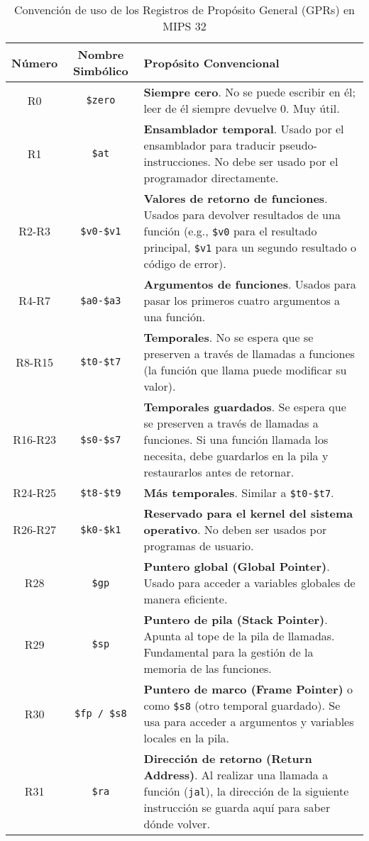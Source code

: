 \documentclass[letterpaper]{article}
\begin{document}
	\begin{table}[h!]
		\centering 
		\caption{Convención de uso de los Registros de Propósito General (GPRs) en MIPS 32} 
		\label{tab:mips_registers} 
		
		\begin{tabular}{c c p{8cm}}
			\toprule 
			\textbf{Número} & \textbf{Nombre Simbólico} & \textbf{Propósito Convencional} \\
			\midrule %
			R0 & \texttt{\$zero} & \textbf{Siempre cero}. No se puede escribir en él; leer de él siempre devuelve 0. Muy útil. \\
			R1 & \texttt{\$at} & \textbf{Ensamblador temporal}. Usado por el ensamblador para traducir pseudo-instrucciones. No debe ser usado por el programador directamente. \\
			R2-R3 & \texttt{\$v0-\$v1} & \textbf{Valores de retorno de funciones}. Usados para devolver resultados de una función (e.g., \texttt{\$v0} para el resultado principal, \texttt{\$v1} para un segundo resultado o código de error). \\
			R4-R7 & \texttt{\$a0-\$a3} & \textbf{Argumentos de funciones}. Usados para pasar los primeros cuatro argumentos a una función. \\
			R8-R15 & \texttt{\$t0-\$t7} & \textbf{Temporales}. No se espera que se preserven a través de llamadas a funciones (la función que llama puede modificar su valor). \\
			R16-R23 & \texttt{\$s0-\$s7} & \textbf{Temporales guardados}. Se espera que se preserven a través de llamadas a funciones. Si una función llamada los necesita, debe guardarlos en la pila y restaurarlos antes de retornar. \\
			R24-R25 & \texttt{\$t8-\$t9} & \textbf{Más temporales}. Similar a \texttt{\$t0-\$t7}. \\
			R26-R27 & \texttt{\$k0-\$k1} & \textbf{Reservado para el kernel del sistema operativo}. No deben ser usados por programas de usuario. \\
			R28 & \texttt{\$gp} & \textbf{Puntero global (Global Pointer)}. Usado para acceder a variables globales de manera eficiente. \\
			R29 & \texttt{\$sp} & \textbf{Puntero de pila (Stack Pointer)}. Apunta al tope de la pila de llamadas. Fundamental para la gestión de la memoria de las funciones. \\
			R30 & \texttt{\$fp / \$s8} & \textbf{Puntero de marco (Frame Pointer)} o como \texttt{\$s8} (otro temporal guardado). Se usa para acceder a argumentos y variables locales en la pila. \\
			R31 & \texttt{\$ra} & \textbf{Dirección de retorno (Return Address)}. Al realizar una llamada a función (\texttt{jal}), la dirección de la siguiente instrucción se guarda aquí para saber dónde volver. \\
			\bottomrule 
		\end{tabular}
	\end{table}
	
\end{document}
